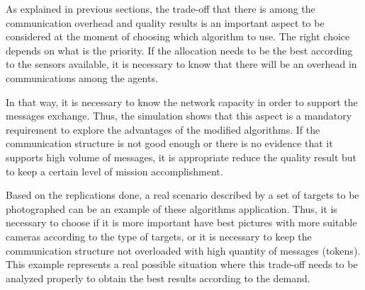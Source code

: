 As explained in previous sections, the trade-off that there is among the communication overhead and quality results is an important aspect to be considered at the moment of choosing which algorithm to use. The right choice depends on what is the priority. If the allocation needs to be the best according to the sensors available, it is necessary to know that there will be an overhead in communications among the agents. 

In that way, it is necessary to know the network capacity in order to support the messages exchange. Thus, the simulation shows that this aspect is a mandatory requirement to explore the advantages of the modified algorithms. If the communication structure is not good enough or there is no evidence that it supports high volume of messages, it is appropriate reduce the quality result but to keep a certain level of mission accomplishment.

Based on the replications done, a real scenario described by a set of targets to be photographed can be an example of these algorithms application. Thus, it is necessary to choose if it is more important have best pictures with more suitable cameras according to the type of targets, or it is necessary to keep the communication structure not overloaded with high quantity of messages (tokens). This example represents a real possible situation where this trade-off needs to be analyzed properly to obtain the best results according to the demand.
